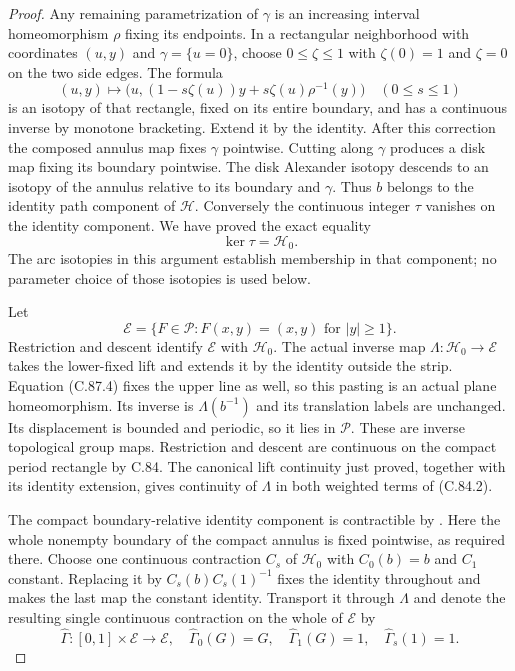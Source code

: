 \begin{proof}
Any remaining parametrization of
$\gamma$ is an increasing interval
homeomorphism $\rho$ fixing its
endpoints. In a rectangular
neighborhood with coordinates
$(u,y)$ and $\gamma=\{u=0\}$,
choose $0\leq\zeta\leq1$ with
$\zeta(0)=1$ and $\zeta=0$ on
the two side edges. The formula
\[
       (u,y)\longmapsto
       \bigl(u,(1-s\zeta(u))y+s\zeta(u)\rho^{-1}(y)\bigr)
                              \quad(0\leq s\leq1)               \tag{C.87.3}
\]
is an isotopy of that rectangle,
fixed on its entire boundary,
and has a continuous inverse by
monotone bracketing. Extend it by
the identity. After this correction
the composed annulus map fixes
$\gamma$ pointwise. Cutting along
$\gamma$ produces a disk map
fixing its boundary pointwise.
The disk Alexander isotopy descends
to an isotopy of the annulus
relative to its boundary and
$\gamma$. Thus $b$ belongs to the
identity path component of
$\mathscr H$. Conversely the
continuous integer $\tau$ vanishes
on the identity component. We have
proved the exact equality
\[
                         \ker\tau=\mathscr H_0.                 \tag{C.87.4}
\]
The arc isotopies in this argument
establish membership in that
component; no parameter choice
of those isotopies is used below.

Let
\[
 \mathscr E=\{F\in\mathscr P:
                    F(x,y)=(x,y)\text{ for }|y|\geq1\}.
                                                               \tag{C.87.5}
\]
Restriction and descent identify
$\mathscr E$ with $\mathscr H_0$.
The actual inverse map
$\Lambda:\mathscr H_0\to\mathscr E$
takes the lower-fixed lift and
extends it by the identity outside
the strip. Equation (C.87.4) fixes
the upper line as well, so this
pasting is an actual plane
homeomorphism. Its inverse is
$\Lambda(b^{-1})$ and its
translation labels are unchanged.
Its displacement is bounded and
periodic, so it lies in
$\mathscr P$.
These are inverse topological
group maps. Restriction and
descent are continuous on the
compact period rectangle by
C.84. The canonical lift
continuity just proved, together
with its identity extension,
gives continuity of $\Lambda$
in both weighted terms of
(C.84.2).

The compact boundary-relative
identity component is contractible
by
\cite[Lemma~2.1(ii), pp.~2--3]{C_Yagasaki2000}.
Here the whole nonempty boundary
of the compact annulus is fixed
pointwise, as required there.
Choose one continuous contraction
$C_s$ of $\mathscr H_0$ with
$C_0(b)=b$ and $C_1$ constant.
Replacing it by
$C_s(b)C_s(1)^{-1}$ fixes the
identity throughout and makes
the last map the constant
identity. Transport it through
$\Lambda$ and denote the resulting
single continuous contraction
on the whole of $\mathscr E$ by
\[
 \widehat\Gamma:[0,1]\times\mathscr E\to\mathscr E,
 \quad
 \widehat\Gamma_0(G)=G,\quad
 \widehat\Gamma_1(G)=1,\quad
 \widehat\Gamma_s(1)=1.
                                                               \tag{C.87.6}
\]


\end{proof}
